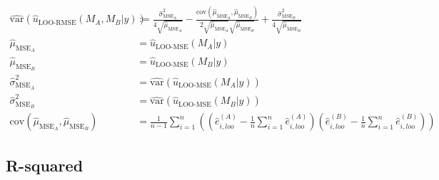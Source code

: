 \documentclass{article}
\newcommand{\residual}[2][i]{\hat{e}_{#1}^{(#2)}}
\begin{document}
\begin{equation}
\begin{aligned}
\widehat{\text{var}} \left( \hat{u}_{\text{LOO-RMSE}}(M_A, M_B | y) \right) &:=  \frac{\hat{\sigma}^2_{\text{MSE}_A}}{4\sqrt{\hat{\mu}_{\text{MSE}_A}}} - 
\frac{\text{cov}(\hat{\mu}_{\text{MSE}_A},\hat{\mu}_{\text{MSE}_B})}{2 \sqrt{\hat{\mu}_{\text{MSE}_A}} \sqrt{\hat{\mu}_{\text{MSE}_B}}} + 
\frac{\hat{\sigma}^2_{\text{MSE}_B}}{4\sqrt{\hat{\mu}_{\text{MSE}_B}}} \\
\hat{\mu}_{\text{MSE}_A} &= \hat{u}_{\text{LOO-MSE}}(M_A | y)\\
\hat{\mu}_{\text{MSE}_B} &= \hat{u}_{\text{LOO-MSE}}(M_B | y)\\
\hat{\sigma}^2_{\text{MSE}_A} &= \widehat{\text{var}}\left(\hat{u}_{\text{LOO-MSE}}(M_A | y)\right) \\
\hat{\sigma}^2_{\text{MSE}_B} &= \widehat{\text{var}}\left(\hat{u}_{\text{LOO-MSE}}(M_B | y)\right) \\
\text{cov}(\hat{\mu}_{\text{MSE}_A},\hat{\mu}_{\text{MSE}_B}) &= \frac{1}{n -1 } \sum_{i = 1}^n \left( \left( \residual[i,loo]{A} - \frac{1}{n} \sum_{i=1}^n \residual[i,loo]{A} \right) \left( \residual[i,loo]{B} - \frac{1}{n} \sum_{i=1}^n \residual[i,loo]{B} \right) \right)
\end{aligned}\label{eq:var-loo-rmse-diff}
\end{equation}

\subsection{R-squared}

\end{document}
